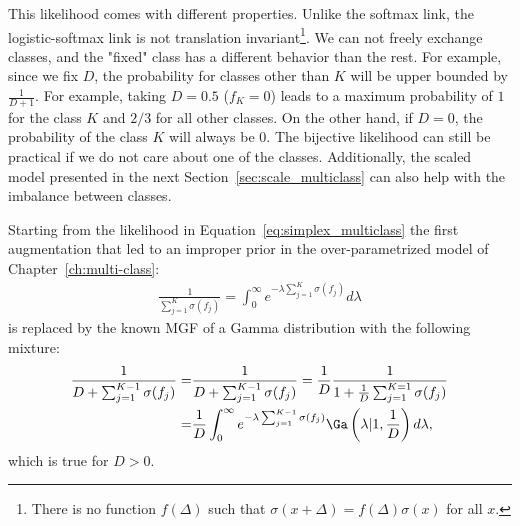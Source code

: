 This likelihood comes with different properties.
Unlike the softmax link, the logistic-softmax link is not translation invariant\footnote{There is no function $f(\Delta)$ such that $\sigma(x + \Delta) = f(\Delta)\sigma(x)$ for all $x$.}.
We can not freely exchange classes, and the "fixed" class has a different behavior than the rest.
For example, since we fix $D$, the probability for classes other than $K$ will be upper bounded by $\frac{1}{D + 1}$.
For example, taking $D=0.5$ ($f_K = 0$) leads to a maximum probability of $1$ for the class $K$ and $2/3$ for all other classes.
On the other hand, if $D=0$, the probability of the class $K$ will always be $0$.
The bijective likelihood can still be practical if we do not care about one of the classes.
Additionally, the scaled model presented in the next Section~\ref{sec:scale_multiclass} can also help with the imbalance between classes.

Starting from the likelihood in Equation~\ref{eq:simplex_multiclass} the first augmentation that led to an improper prior in the over-parametrized model of Chapter~\ref{ch:multi-class}:
\begin{align*}
    \frac{1}{\sum_{j=1}^{K} \sigma(f_j)} = \int_0^\infty e^{-\lambda  \sum_{j=1}^{K} \sigma(f_j)}d\lambda
\end{align*}
is replaced by the known \ac{MGF} of a Gamma distribution with the following mixture:
\begin{align*}
    \frac{1}{D + \sum_{j=1}^{K-1} \sigma(f_j)} =& \frac{1}{D + \sum_{j=1}^{K-1} \sigma(f_j)} = \frac{1}{D}\frac{1}{1+\frac{1}{D}\sum_{j=1}^{K=1}\sigma(f_j)}\\
    =& \frac{1}{D}\int_0^\infty e^{-\lambda \sum_{j=1}^{K-1} \sigma(f_j)}\Ga \left(\lambda|1, \frac{1}{D}\right)d\lambda,
\end{align*}
which is true for $D > 0$.

